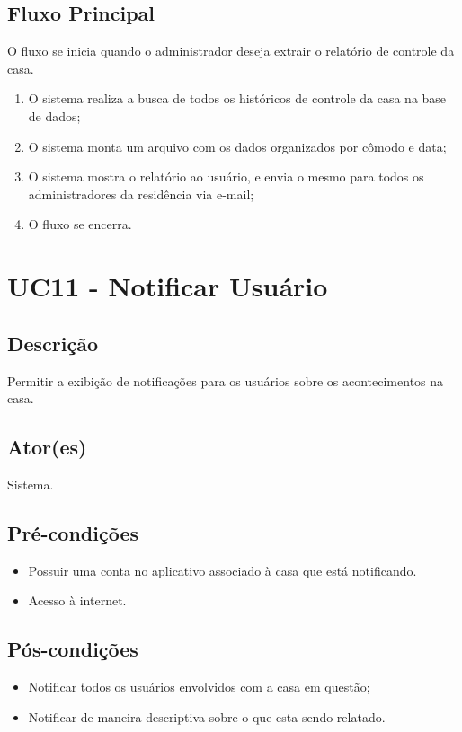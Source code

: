     \subsection{Fluxo Principal}
        O fluxo se inicia quando o administrador deseja extrair o relatório de controle da casa.
        \begin{enumerate}
            \item O sistema realiza a busca de todos os históricos de controle da casa na base de dados;
            \item O sistema monta um arquivo com os dados organizados por cômodo e data;
            \item O sistema mostra o relatório ao usuário, e envia o mesmo para todos os administradores da residência via e-mail;
            \item O fluxo se encerra.
        \end{enumerate}

\section{UC11 \-- Notificar Usuário}
    \subsection{Descrição}
        Permitir a exibição de notificações para os usuários sobre os acontecimentos na casa.
    \subsection{Ator(es)}
        Sistema.
    \subsection{Pré-condições}
        \begin{itemize}
            \item Possuir uma conta no aplicativo associado à casa que está notificando.
            \item Acesso à internet.
        \end{itemize}
    \subsection{Pós-condições}
        \begin{itemize}
            \item Notificar todos os usuários envolvidos com a casa em questão;
            \item Notificar de maneira descriptiva sobre o que esta sendo relatado.
        \end{itemize}
